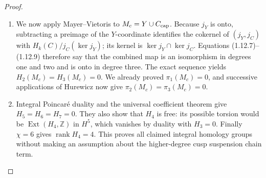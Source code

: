 \begin{proof}
\begin{enumerate}[label=\arabic*.]
\item We now apply Mayer--Vietoris to $M_c=Y\cup C_{\rm cap}$.
Because $j_Y$ is onto, subtracting a preimage of the $Y$-coordinate
identifies the cokernel of $(j_Y,j_C)$ with
$H_k(C)/j_C(\ker j_Y)$; its kernel is
$\ker j_Y\cap\ker j_C$.
Equations (1.12.7)--(1.12.9) therefore say that the combined map is an
isomorphism in degrees one and two and is onto in degree three.
The exact sequence yields $H_2(M_c)=H_3(M_c)=0$.
We already proved $\pi_1(M_c)=0$, and successive applications of
Hurewicz now give $\pi_2(M_c)=\pi_3(M_c)=0$.

\item Integral Poincar\'e duality and the universal coefficient theorem
give $H_5=H_6=H_7=0$.  They also show that $H_4$ is free: its possible
torsion would be $\operatorname{Ext}(H_4,\mathbb Z)$ in $H^5$, which
vanishes by duality with $H_3=0$.
Finally $\chi=6$ gives $\operatorname{rank}H_4=4$.
This proves all claimed integral homology groups without making an
assumption about the higher-degree cusp suspension chain term.

\end{enumerate}
\end{proof}




